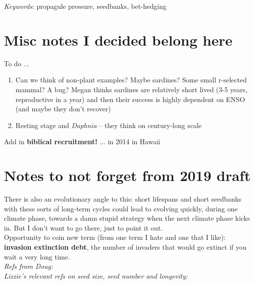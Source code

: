 \documentclass[11pt]{article}
\begin{document}
\emph{Keywords}: propagule pressure, seedbanks, bet-hedging

\section{Misc notes I decided belong here}

To do ...
\begin{enumerate}
\item Can we think of non-plant examples? Maybe sardines? Some small r-selected mammal? A bug? Megan thinks sardines are relatively short lived (3-5 years, reproductive in a year) and then their success is highly dependent on ENSO (and maybe they don't recover) 
\item Resting stage and \emph{Daphnia} -- they think on century-long scale 
\end{enumerate}

Add in {\bf biblical recruitment!} ... in 2014 in Hawaii %

\section{Notes to not forget from 2019 draft}

There is also an evolutionary angle to this: short lifespans and short seedbanks with these sorts of long-term cycles could lead to evolving quickly, during one climate phase, towards a damn stupid strategy when the next climate phase kicks in. But I don't want to go there, just to point it out.\\

\noindent Opportunity to coin new term (from one term I hate and one that I like): {\bf invasion extinction debt}, the number of invaders that would go extinct if you wait a very long time. \\

\noindent \emph{Refs from Doug:} \citep{Davison2010,morris2008,Tuljapurkar2009}\\

\noindent \emph{Lizzie's relevant refs on seed size, seed number and longevity:} \citep{moleswest2006,rees2009,saatkamp2009,silvertown1981,thompson1987,venable1988}\\
\end{document}
